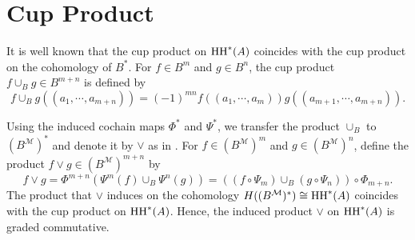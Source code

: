 \documentclass[10pt, reqno]{amsart}
\theoremstyle{definition}
\theoremstyle{remark}
\numberwithin{equation}{section}
\begin{document}
\section{Cup Product}\label{sec: Cup Product}
It is well known that the cup product on $\mathrm{HH}^*(A)$ coincides with the cup product on the cohomology of \(B^*\). For \(f\in B^m\) and \(g\in B^n\), the cup product
\(f\cup_B g\in B^{m+n}\) is defined by
\[f \cup_B g((a_1, \cdots , a_{m+n}))=(-1)^{mn}f((a_1, \cdots, a_m))g((a_{m+1}, \cdots, a_{m+n})).\]

Using the induced cochain maps \(\Phi^*\) and \(\Psi^*\), we transfer the product \(\cup_B\) to \((B^{\mathcal M})^*\) and denote it by \(\lor\) as in \cite{BIKLZ26}.
For \(f\in (B^{\mathcal M})^m\) and \(g\in (B^{\mathcal M})^n\), define the product \(f \lor g \in (B^{\mathcal M})^{m+n}\) by
\[f \lor g= \Phi^{m+n}(\Psi^m(f)\cup_B \Psi^n(g))=((f\circ\Psi_m) \cup_B (g\circ\Psi_n))\circ\Phi_{m+n}.\]
The product that \(\lor\) induces on the cohomology \(H((B^{\mathcal M})^*)\cong\mathrm{HH}^*(A)\) coincides with the cup product on \(\mathrm{HH}^*(A)\). Hence, the induced product \(\lor\) on \(\mathrm{HH}^*(A)\) is graded commutative.
\end{document}
